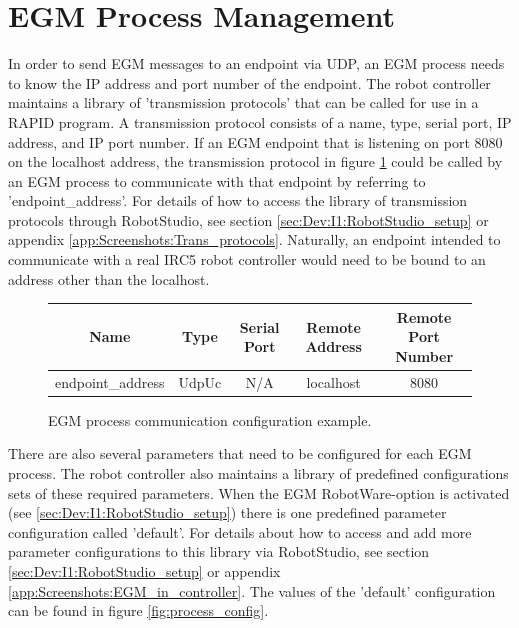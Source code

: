 \documentclass{cslthse-msc}
\begin{document}
\section{EGM Process Management}
\label{sec:EGM:Process_Management}
In order to send EGM messages to an endpoint via UDP, an EGM process needs to know the IP address and port number of the endpoint. The robot controller maintains a library of 'transmission protocols' that can be called for use in a RAPID program. A transmission protocol consists of a name, type, serial port, IP address, and IP port number. If an EGM endpoint that is listening on port 8080 on the localhost address, the transmission protocol in figure \ref{fig:process_comm} could be called by an EGM process to communicate with that endpoint by referring to 'endpoint\_address'. For details of how to access the library of transmission protocols through RobotStudio, see section \ref{sec:Dev:I1:RobotStudio_setup} or appendix \ref{app:Screenshots:Trans_protocols}. Naturally, an endpoint intended to communicate with a real IRC5 robot controller would need to be bound to an address other than the localhost.
\begin{figure}[H]
    \centering
    \vspace{0.5cm}
    \begin{tabular}{|c|c|c|c|c|}
    \hline
\textbf{Name} & \textbf{Type} & \textbf{Serial Port} & \textbf{Remote Address} & \textbf{Remote Port Number}\\ \hline
endpoint\_address & UdpUc & N/A & localhost & 8080 \\ \hline
    \end{tabular}
    \caption{EGM process communication configuration example.}
    \label{fig:process_comm}
\end{figure}
\vspace{0.5cm}
There are also several parameters that need to be configured for each EGM process. The robot controller also maintains a library of predefined configurations sets of these required parameters. When the EGM RobotWare-option is activated (see \ref{sec:Dev:I1:RobotStudio_setup}) there is one predefined parameter configuration called 'default'. For details about how to access and add more parameter configurations to this library via RobotStudio, see section \ref{sec:Dev:I1:RobotStudio_setup} or appendix \ref{app:Screenshots:EGM_in_controller}. The values of the 'default' configuration can be found in figure \ref{fig:process_config}. 
\end{document}

